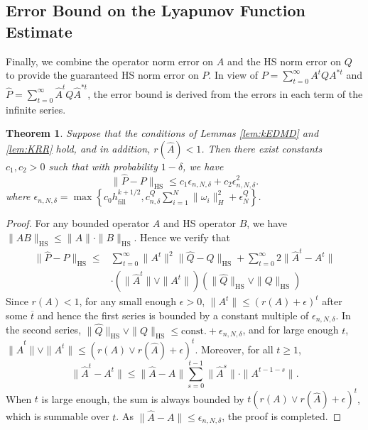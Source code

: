 \documentclass[english]{cccconf}
\newtheorem{theorem}{Theorem}
\newcommand{\mr}[1]{\mathrm{#1}}
\newcommand{\BRA}[1]{\left\{ #1 \right\}}
\begin{document}
\subsection{Error Bound on the Lyapunov Function Estimate}
Finally, we combine the operator norm error on $A$ and the HS norm error on $Q$ to provide the guaranteed HS norm error on $P$. In view of $P = \sum_{t=0}^\infty A^tQA^{\ast t}$ and $\hat{P} = \sum_{t=0}^\infty \hat{A}^t Q \hat{A}^{\ast t}$, the error bound is derived from the errors in each term of the infinite series. 
\begin{theorem}\label{th:error.bound}
    Suppose that the conditions of Lemmas \ref{lem:kEDMD} and \ref{lem:KRR} hold, and in addition, $r(\hat{A})<1$. Then there exist constants $c_1, c_2>0$ such that with probability $1-\delta$, we have
    $$\|\hat{P}-P\|_{\mr{HS}}\leq c_1\epsilon_{n, N, \delta} + c_2\epsilon_{n, N, \delta}^2. $$
    where $\epsilon_{n, N, \delta} = \max\BRA{c_0h_{\mr{fill}}^{k+1/2}, c^Q_{n,\delta} \sum_{i=1}^N \|\omega_i\|_{H}^2 + \epsilon^Q_N }$. 
\end{theorem}
\begin{proof}
    For any bounded operator $A$ and HS operator $B$, we have $\|AB\|_{\mr{HS}}\leq \|A\|\cdot \|B\|_{\mr{HS}}$. Hence we verify that 
    \begin{align*}
    \|\hat{P}-P\|_{\mr{HS}} \leq &  \sum_{t=0}^\infty \|A^t\|^2 \|\hat{Q}-Q\|_{\mr{HS}} + \sum_{t=0}^\infty 2\|\hat{A}^t - A^t\| \\ 
    & \cdot (\|\hat{A}^t\|\vee \|A^t\|)(\|\hat{Q}\|_{\mr{HS}} \vee \|Q\|_{\mr{HS}}) 
    \end{align*} 
    Since $r(A)<1$, for any small enough $\epsilon>0$, $\|A^t\| \leq (r(A)+\epsilon)^t$ after some $\overline{t}$ and hence the first series is bounded by a constant multiple of $\epsilon_{n,N,\delta}$. In the second series, $\|\hat{Q}\|_{\mr{HS}} \vee \|Q\|_{\mr{HS}} \leq \mr{const.}+\epsilon_{n,N,\delta}$, and for large enough $t$, $\|\hat{A}^t\|\vee \|A^t\|\leq (r(A)\vee r(\hat{A})+\epsilon)^t$. Moreover, for all $t\geq 1$, 
    $$\textstyle 
    \|\hat{A}^t - A^t\|\leq \|\hat{A}-A\|\sum_{s=0}^{t-1} \|\hat{A}^s\|\cdot \|A^{t-1-s}\|.$$
    When $t$ is large enough, the sum is always bounded by $t(r(A)\vee r(\hat{A})+\epsilon)^t$, which is summable over $t$. As $\|\hat{A}-A\|\leq \epsilon_{n,N,\delta}$, the proof is completed. 
\end{proof}
\end{document}
